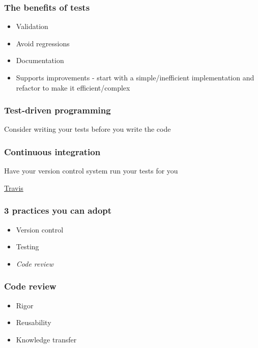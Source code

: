 \documentclass{beamer}
\begin{document}
\begin{frame}
\frametitle{The benefits of tests}
\begin{itemize}
\pause
\item
Validation
\pause
\item
Avoid regressions
\pause
\item
Documentation
\pause
\item
Supports improvements - start with a simple/inefficient implementation and refactor
to make it efficient/complex
\end{itemize}
\end{frame}


\begin{frame}
\frametitle{Test-driven programming}
Consider writing your tests before you write the code
\end{frame}


\begin{frame}
\frametitle{Continuous integration}
Have your version control system run your tests for you

\href{https://travis-ci.org}{Travis}
\end{frame}

\begin{frame}
\frametitle{3 practices you can adopt}
\begin{itemize}
\item
Version control
\item
Testing
\item
\emph{Code review}
\end{itemize}
\end{frame}



\begin{frame}
\frametitle{Code review
  \footnotemark[1] \footnotemark[2]}
\begin{itemize}
\pause
\item
Rigor
\pause
\item
Reusability
\pause
\item
Knowledge transfer
\end{itemize}
\end{frame}
\end{document}
